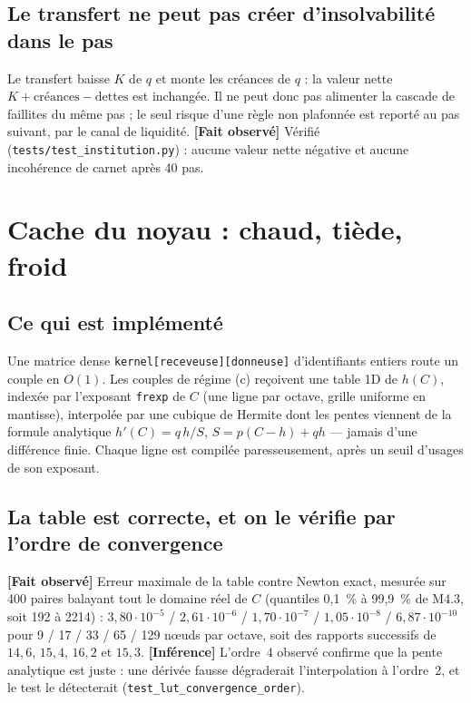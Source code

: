 \documentclass[11pt,a4paper]{article}
\newcommand{\code}[1]{\texttt{#1}}
\newcommand{\fait}{\textbf{[Fait observé]}}
\newcommand{\inference}{\textbf{[Inférence]}}
\begin{document}
\subsection{Le transfert ne peut pas créer d'insolvabilité dans le pas}

Le transfert baisse $K$ de $q$ et monte les créances de $q$ : la valeur
nette $K+\text{créances}-\text{dettes}$ est inchangée. Il ne peut donc pas
alimenter la cascade de faillites du même pas ; le seul risque d'une règle
non plafonnée est reporté au pas suivant, par le canal de liquidité.
\fait{} Vérifié (\code{tests/test\_institution.py}) : aucune valeur nette
négative et aucune incohérence de carnet après 40 pas.

\section{Cache du noyau : chaud, tiède, froid}
\label{sec:cache}

\subsection{Ce qui est implémenté}

Une matrice dense \code{kernel[receveuse][donneuse]} d'identifiants entiers
route un couple en $O(1)$. Les couples de régime (c) reçoivent une table
1D de $h(C)$, indexée par l'exposant \code{frexp} de $C$ (une ligne par
octave, grille uniforme en mantisse), interpolée par une cubique de
Hermite dont les pentes viennent de la formule analytique
$h'(C)=q\,h/S$, $S=p(C-h)+qh$ --- jamais d'une différence finie. Chaque
ligne est compilée paresseusement, après un seuil d'usages de son exposant.

\subsection{La table est correcte, et on le vérifie par l'ordre de convergence}

\fait{} Erreur maximale de la table contre Newton exact, mesurée sur 400
paires balayant tout le domaine réel de $C$ (quantiles 0,1~\% à 99,9~\% de
M4.3, soit 192 à 2214) : $3{,}80\cdot10^{-5}$ / $2{,}61\cdot10^{-6}$ /
$1{,}70\cdot10^{-7}$ / $1{,}05\cdot10^{-8}$ / $6{,}87\cdot10^{-10}$ pour
9 / 17 / 33 / 65 / 129 nœuds par octave, soit des rapports successifs de
$14{,}6$, $15{,}4$, $16{,}2$ et $15{,}3$. \inference{} L'ordre~4 observé
confirme que la pente analytique est juste : une dérivée fausse dégraderait
l'interpolation à l'ordre~2, et le test le détecterait
(\code{test\_lut\_convergence\_order}).
\end{document}
